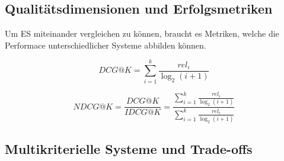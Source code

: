 \subsection{Qualitätsdimensionen und Erfolgsmetriken}
Um \ac{ES} miteinander vergleichen zu können, braucht es Metriken, welche die Performace unterschiedlicher
Systeme abbilden können. 

\begin{equation}
\label{eq:dcg}
DCG@K=\sum_{i=1}^{k}\frac{rel_{i}}{\log_2(i+1)}
\end{equation}

\label{sec:idcg}

\begin{equation}
\label{eq:ndcg}
NDCG@K=\frac{DCG@K}{IDCG@K}=\frac{\sum_{i=1}^{k}\frac{rel_{i}}{\log_2(i+1)}}{\sum_{i=1}^{k}\frac{rel_{i}}{\log_2(i+1)}}
\end{equation}

\subsection{Multikriterielle Systeme und Trade-offs}

